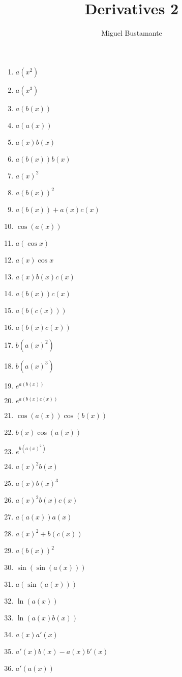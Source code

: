 \documentclass{article}
\title{Derivatives 2}
\author{Miguel Bustamante}
\begin{document}
\maketitle
\begin{multicols}{2} %
\begin{enumerate}
    \item $a(x^2)$
    \item $a(x^3)$
    \item $a(b(x))$
    \item $a(a(x))$
    \item $a(x)b(x)$
    \item $a(b(x))b(x)$
    \item $a(x)^2$
    \item $a(b(x))^2$
    \item $a(b(x))+a(x)c(x)$
    \item $\cos(a(x))$
    \item $a(\cos x)$
    \item $a(x)\cos x$
    \item $a(x)b(x)c(x)$
    \item $a(b(x))c(x)$
    \item $a(b(c(x)))$
    \item $a(b(x)c(x))$
    \item $b(a(x)^2)$
    \item $b(a(x)^3)$
    \item $e^{a(b(x))}$
    \item $e^{a(b(x)c(x))}$
    \item $\cos(a(x))\cos(b(x))$
    \item $b(x)\cos(a(x))$
    \item $e^{b(a(x)^2)}$
    \item $a(x)^2 b(x)$
    \item $a(x)b(x)^3$
    \item $a(x)^2 b(x)c(x)$
    \item $a(a(x))a(x)$
    \item $a(x)^2+b(c(x))$
    \item $a(b(x))^2$
    \item $\sin(\sin(a(x)))$
    \item $a(\sin(a(x)))$
    \item $\ln(a(x))$
    \item $\ln(a(x)b(x))$
    \item $a(x)a'(x)$
    \item $a'(x)b(x)-a(x)b'(x)$
    \item $a'(a(x))$

\end{enumerate}
\end{multicols}
\end{document}
